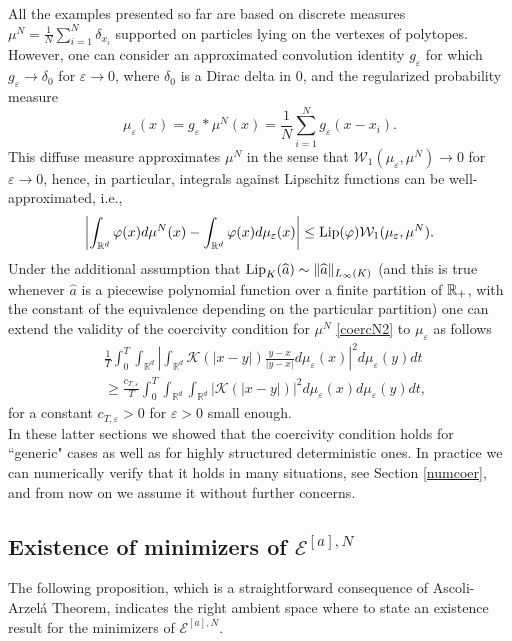All the examples presented so far are based on discrete measures $\mu^N=\frac{1}{N} \sum_{i=1}^N\delta_{x_i}$ supported on particles lying on the vertexes of polytopes. However, one can consider an approximated convolution identity $g_\varepsilon$ for which $g_\varepsilon \to \delta_0$ for $\varepsilon \to 0$, where $\delta_0$ is a Dirac delta in $0$, and  the regularized probability measure
$$
\mu_\varepsilon(x) = g_\varepsilon * \mu^N (x)= \frac{1}{N} \sum_{i=1}^N g_\varepsilon (x-x_i).
$$
This diffuse measure approximates $\mu^N$ in the sense that $\mathcal W_1(\mu_\varepsilon,\mu^N) \to 0$ for $\varepsilon \to 0$, hence, in particular, integrals against Lipschitz functions can be well-approximated, i.e.,
$$
\left | \int_{\mathbb R^d} \varphi(x) d \mu^N(x) -\int_{\mathbb R^d}  \varphi(x) d \mu_\varepsilon(x) \right | \leq \textup{Lip}(\varphi) \mathcal W_1(\mu_\varepsilon,\mu^N) .
$$
Under the additional assumption that $\textup{Lip}_K(\widehat a) \sim \| \widehat a \|_{L_\infty(K)}$ (and this is true whenever $\widehat a$ is a piecewise polynomial function over a finite partition of $\mathbb{R}_+$, with the constant of the equivalence depending on the particular partition) one can extend the validity of the coercivity condition for $\mu^N$ \eqref{coercN2} 
to $\mu_\varepsilon$ as follows
\begin{align*}
&\frac{1}{T} \int_0^T \int_{\mathbb R^d}  \left | \int_{\mathbb R^d}  \mathcal K(|x-y|) \frac{y-x}{|y-x|} d \mu_\varepsilon(x) \right |^2 d\mu_\varepsilon(y) dt \\
& \geq  \frac{c_{T,\varepsilon }}{T} \int_0^T  \int_{\mathbb R^d}  \int_{\mathbb R^d}  |\mathcal K(|x-y|)|^2    d\mu_\varepsilon(x) d\mu_\varepsilon(y)dt,
\end{align*}
for a constant $c_{T,\varepsilon }>0$ for $\varepsilon>0$ small enough.
\\

In these latter sections we showed that the coercivity condition holds for ``generic" cases as well as for highly structured deterministic ones. In practice we can numerically verify that it holds in many situations, see Section \ref{numcoer}, and from now on we assume it without further concerns. 




\subsection{Existence of minimizers of $\mathcal E^{[a],N}$}
The following proposition, which is a straightforward consequence of Ascoli-Arzel\'a Theorem, indicates the right ambient space where to state an existence result for the minimizers of $\mathcal E^{[a],N}$.


